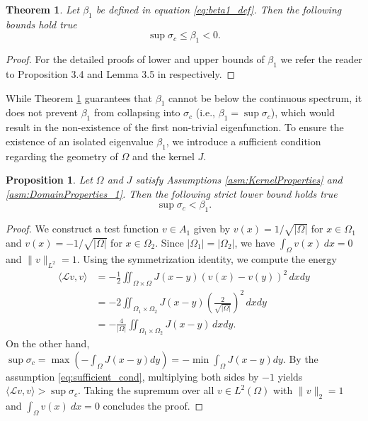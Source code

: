 \documentclass[12pt, a4paper]{article}
\theoremstyle{break}
\newtheorem{thm}{Theorem}[section]
\theoremstyle{break}
\newtheorem{prp}{Proposition}[section]
\theoremstyle{break}
\theoremstyle{break}
\theoremstyle{break}
\theoremstyle{break}
\theoremstyle{break}
\theoremstyle{break}
\theoremstyle{break}
\begin{document}
\begin{thm}
    \label{thm:beta1_bounds}
    Let $\beta_1$ be defined in equation \eqref{eq:beta1_def}. Then the following bounds hold true
    \begin{equation}
        \sup \sigma_c \leq \beta_1 < 0.
    \end{equation}
\end{thm}
\begin{proof}
    For the detailed proofs of lower and upper bounds of $\beta_1$ we refer the reader to Proposition 3.4 and Lemma 3.5 in \cite{AndreuVaillo2010} respectively.
\end{proof}

While Theorem \ref{thm:beta1_bounds} guarantees that $\beta_1$ cannot be below the continuous spectrum, it does not prevent $\beta_1$ from collapsing into $\sigma_c$ (i.e., $\beta_1 = \sup \sigma_c$), which would result in the non-existence of the first non-trivial eigenfunction. To ensure the existence of an isolated eigenvalue $\beta_1$, we introduce a sufficient condition regarding the geometry of $\Omega$ and the kernel $J$.

\begin{prp}
    \label{prop:spectral_gap}
    Let $\Omega$ and $J$ satisfy Assumptions \ref{asm:KernelProperties} and \ref{asm:DomainProperties_1}.
    Then the following strict lower bound holds true
    \begin{equation*}
        \sup \sigma_c < \beta_1.
    \end{equation*}
\end{prp}
\begin{proof}
    We construct a test function $v \in A_1$ given by $v(x) = 1/\sqrt{|\Omega|}$ for $x \in \Omega_1$ and $v(x) = -1/\sqrt{|\Omega|}$ for $x \in \Omega_2$. Since $|\Omega_1|=|\Omega_2|$, we have $\int_\Omega v(x)\:dx = 0$ and $\|v\|_{L^2}=1$. Using the symmetrization identity, we compute the energy
    \begin{align*}
        \langle \mathcal{L}v, v \rangle &= -\frac{1}{2} \iint_{\Omega \times \Omega} J(x-y)(v(x)-v(y))^2 \, dx dy \\
        &= -2 \iint_{\Omega_1 \times \Omega_2} J(x-y) \left( \frac{2}{\sqrt{|\Omega|}} \right)^2 \, dx dy \\
        &= -\frac{4}{|\Omega|} \iint_{\Omega_1 \times \Omega_2} J(x-y) \, dx dy.
    \end{align*}
    On the other hand, $\sup \sigma_c = \max (-\int_\Omega J(x-y)dy) = - \min \int_\Omega J(x-y)dy$. 
    By the assumption \eqref{eq:sufficient_cond}, multiplying both sides by $-1$ yields $\langle \mathcal{L}v, v \rangle > \sup \sigma_c$. Taking the supremum over all $v \in L^2(\Omega)$ with $\|v\|_2 = 1$ and $\int_\Omega v(x)\:dx = 0$ concludes the proof.
\end{proof}
\end{document}
